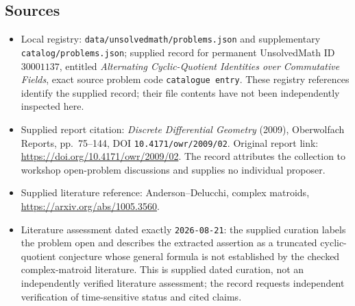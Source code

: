 \documentclass[11pt]{article}
\begin{document}
\subsection{Sources}
\begin{itemize}
\item Local registry: \texttt{data/unsolvedmath/problems.json} and supplementary \texttt{catalog/problems.json}; supplied record for permanent UnsolvedMath ID \(30001137\), entitled \emph{Alternating Cyclic-Quotient Identities over Commutative Fields}, exact source problem code \texttt{catalogue entry}. These registry references identify the supplied record; their file contents have not been independently inspected here.
\item Supplied report citation: \emph{Discrete Differential Geometry} (2009), Oberwolfach Reports, pp.~75--144, DOI \texttt{10.4171/owr/2009/02}. Original report link: \url{https://doi.org/10.4171/owr/2009/02}. The record attributes the collection to workshop open-problem discussions and supplies no individual proposer.
\item Supplied literature reference: Anderson--Delucchi, complex matroids, \url{https://arxiv.org/abs/1005.3560}.
\item Literature assessment dated exactly \texttt{2026-08-21}: the supplied curation labels the problem open and describes the extracted assertion as a truncated cyclic-quotient conjecture whose general formula is not established by the checked complex-matroid literature. This is supplied dated curation, not an independently verified literature assessment; the record requests independent verification of time-sensitive status and cited claims.
\end{itemize}
\end{document}
